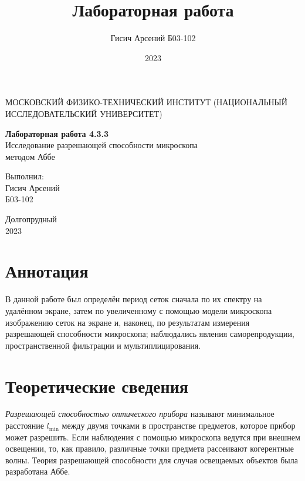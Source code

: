 \documentclass[a4paper, 12pt]{article}
\title{Лабораторная работа}
\author{Гисич Арсений Б03-102}
\date{2023}
\begin{document}
	\begin{center}
		{\large МОСКОВСКИЙ ФИЗИКО-ТЕХНИЧЕСКИЙ ИНСТИТУТ (НАЦИОНАЛЬНЫЙ ИССЛЕДОВАТЕЛЬСКИЙ УНИВЕРСИТЕТ)}
	\end{center}
	\vspace{5 cm}
	{\Large
		\begin{center}
			{\bf Лабораторная работа 4.3.3}\\[0.2 cm]
			Исследование разрешающей способности микроскопа \\ методом Аббе
		\end{center}
	}
	\vspace{4 cm}
	\begin{flushright}
		{\Large Выполнил: \\
			\vspace{0.2 cm}
			Гисич Арсений \\
			\vspace{0.2 cm}
			Б03-102 \\}
	\end{flushright}
	\vspace{8 cm}
	\begin{center}
		Долгопрудный\\[0.1 cm]
		2023
	\end{center}
\thispagestyle{empty}

\section{Аннотация}

В данной работе был определён период сеток сначала по их спектру на удалённом экране, затем по увеличенному с помощью модели микроскопа изображению сеток на экране и, наконец, по результатам измерения разрешающей способности микроскопа; наблюдались явления саморепродукции, пространственной фильтрации и мультиплицирования.

\section{Теоретические сведения}

\textit{Разрешающей способностью оптического прибора} называют минимальное расстояние $l_{\text{min}}$ между двумя точками в пространстве предметов, которое прибор может разрешить. Если наблюдения с помощью микроскопа ведутся при внешнем освещении, то, как правило, различные точки предмета рассеивают когерентные волны. Теория разрешающей способности для случая освещаемых объектов была разработана Аббе.
\end{document}
